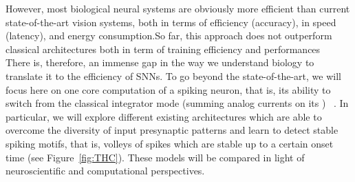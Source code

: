\documentclass[brainsci, %
               review,accept,pdftex,moreauthors
               ]{Definitions/mdpi}
\begin{document}
{However, most biological neural systems are obviously more efficient than current state-of-the-art vision systems, both in terms of efficiency (accuracy), in speed (latency), and energy consumption.}{So far, this approach does not outperform classical architectures both in term of training efficiency and performances}~\citep{davies_loihi_2018} There is, therefore, an immense gap in the way we understand biology to translate it to the efficiency of SNNs. To go beyond the state-of-the-art, we will focus here on one core computation of a spiking neuron, that is, its ability to switch from the classical integrator mode (summing analog currents on its ) ~\citep{paugam-moisy_computing_2012}. In particular, we will explore different existing architectures which are able to overcome the diversity of input presynaptic patterns and learn to detect stable spiking motifs, that is, volleys of spikes which are stable up to a certain onset time (see Figure~\ref{fig:THC}). These models will be compared in light of neuroscientific and computational perspectives. %
\end{document}
